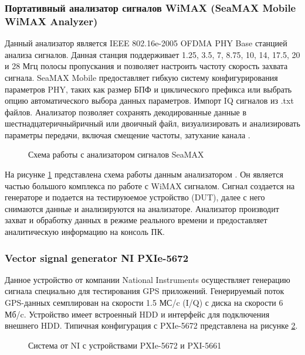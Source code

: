 \subsubsection{Портативный анализатор сигналов WiMAX (SeaMAX Mobile WiMAX Analyzer)}
Данный анализатор является IEEE 802.16e-2005 OFDMA PHY Base станцией анализа сигналов. Данная станция 
поддерживает 1.25, 3.5, 7, 8.75, 10, 14, 17.5, 20 и 28 Мгц полосы пропускания и позволяет настроить
частоту скорость захвата сигнала. SeaMAX Mobile предоставляет гибкую систему конфигурирования параметров PHY, таких как
размер БПФ и циклического префикса или выбрать опцию автоматического выбора данных параметров. Импорт IQ сигналов
из .txt файлов. Анализатор позволяет сохранять декодированные данные в шестнадцатеричныйричный или двоичный файл,
визуализировать и анализировать параметры передачи, включая смещение частоты, затухание канала
\cite{seamax_overview, seamax_pdf}.

\begin{figure}[H]
\caption{Схема работы с анализатором сигналов SeaMAX}
\label{pic:seamax}
\end{figure}

На рисунке \ref{pic:seamax} представлена схема работы данным анализатором \cite{seamax_pdf}. Он является частью большого комплекса по работе
с WiMAX сигналом. Сигнал создается на генераторе и подается на тестируюемое устройство (DUT), далее с него снимаются 
данные и анализируются на анализаторе. Анализатор производит захват и обработку данных в режиме реального времени и
предоставляет аналитическую информацию на консоль ПК.

\subsubsection{Vector signal generator NI PXIe-5672}
Данное устройство от компании National Instruments осуществляет генерацию сигнала специально для тестирования
GPS приложений. Генерируемый поток GPS-данных семплирован на скорости 1.5 МС/c (I/Q) с диска на скорости 6 Мб/c.
Устройство имеет встроенный HDD и интерфейс для подключения внешнего HDD. Типичная конфигурация с PXIe-5672
представлена на рисунке \ref{pic:ni_system}.

\begin{figure}[H]
\begin{center}
\end{center}
\caption{Система от NI с устройствами PXIe-5672 и PXI-5661}
\label{pic:ni_system}
\end{figure}

